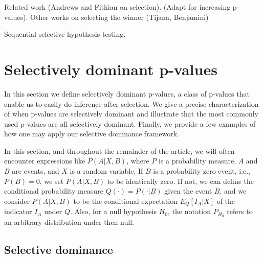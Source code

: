 \documentclass{article}
\begin{document}
Related work (Andrews and Fithian on selection). (Adapt for increasing p-values). Other works on selecting the winner (Tijana, Benjamini) 

Sequential selective hypothesis testing. 


\section{Selectively dominant p-values}
\label{sec:dominance}

In this section we define selectively dominant p-values, a class of p-values that enable us to easily do inference after selection. We give a precise characterization of when p-values are selectively dominant and illustrate that the most commonly used p-values are all selectively dominant. Finally, we provide a few examples of how one may apply our selective dominance framework. 

In this section, and throughout the remainder of the article, we will often encounter expressions like $P(A|X, B)$, where $P$ is a probability measure, $A$ and $B$ are events, and $X$ is a random variable. If $B$ is a probability zero event, i.e., $P(B) = 0$, we set $P(A|X, B)$ to be identically zero. If not, we can define the conditional probability measure $Q(\cdot) = P(\cdot| B)$ given the event $B$, and we consider $P(A | X, B)$ to be the conditional expectation $E_Q[I_A| X]$ of the indicator $I_A$ under $Q$. Also, for a null hypothesis $H_0$, the notation $P_{H_0}$ refers to an arbitrary distribution under then null. %

\subsection{Selective dominance}
\end{document}
